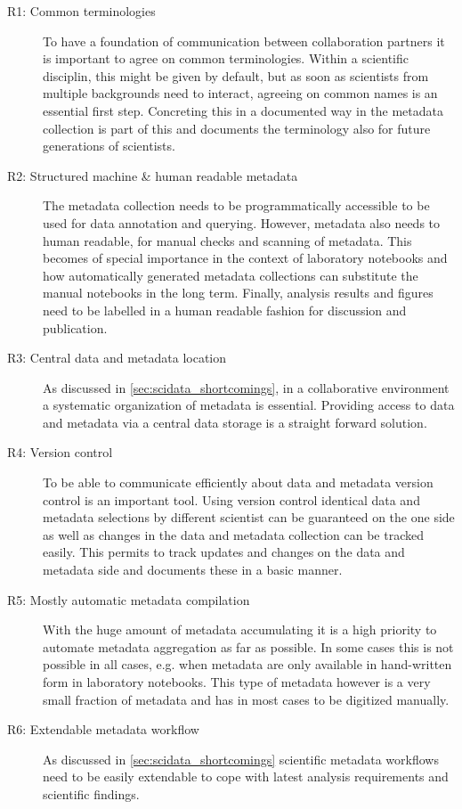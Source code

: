 \begin{description}
 \item[R1: Common terminologies] To have a foundation of communication between collaboration partners it is important to agree on common terminologies. Within a scientific disciplin, this might be given by default, but as soon as scientists from multiple backgrounds need to interact, agreeing on common names is an essential first step. Concreting this in a documented way in the metadata collection is part of this and documents the terminology also for future generations of scientists.
 \item[R2: Structured machine \& human readable metadata] The metadata collection needs to be programmatically accessible to be used for data annotation and querying. However, metadata also needs to human readable, for manual checks and scanning of metadata. This becomes of special importance in the context of laboratory notebooks and how automatically generated metadata collections can substitute the manual notebooks in the long term. Finally, analysis results and figures need to be labelled in a human readable fashion for discussion and publication.
 \item[R3: Central data and metadata location] As discussed in \cref{sec:scidata_shortcomings}, in a collaborative environment a systematic organization of metadata is essential. Providing access to data and metadata via a central data storage is a straight forward solution. 
 \item[R4: Version control] To be able to communicate efficiently about data and metadata version control is an important tool. Using version control identical data and metadata selections by different scientist can be guaranteed on the one side as well as changes in the data and metadata collection can be tracked easily. This permits to track updates and changes on the data and metadata side and documents these in a basic manner.
 \item[R5: Mostly automatic metadata compilation] With the huge amount of metadata accumulating it is a high priority to automate metadata aggregation as far as possible. In some cases this is not possible in all cases, e.g. when metadata are only available in hand-written form in laboratory notebooks. This type of metadata however is a very small fraction of metadata and has in most cases to be digitized manually.
 \item[R6: Extendable metadata workflow] As discussed in \cref{sec:scidata_shortcomings} scientific metadata workflows need to be easily extendable to cope with latest analysis requirements and scientific findings.

\end{description}

